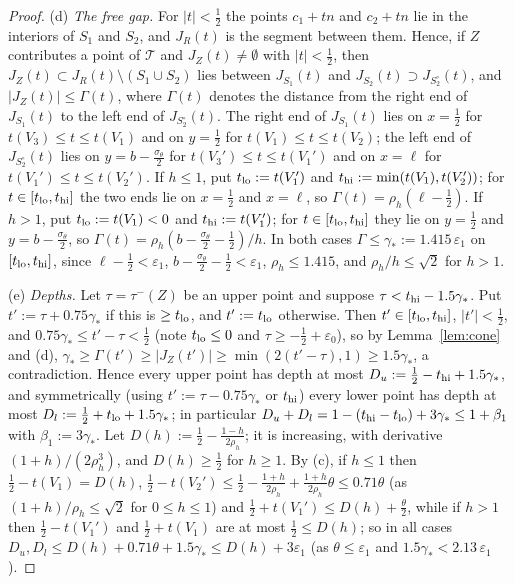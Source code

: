 \documentclass[11pt]{amsart}
\theoremstyle{definition}
\theoremstyle{remark}
\begin{document}
\begin{proof}
(d) \emph{The free gap.} For $|t|<\frac12$ the points $c_1+tn$ and $c_2+tn$ lie in the interiors of $S_1$ and $S_2$, and
$J_R(t)$ is the segment between them. Hence, if $Z$ contributes a point of $\mathcal T$ and $J_Z(t)\neq\emptyset$ with $|t|<\frac12$,
then $J_Z(t)\subset J_R(t)\setminus(S_1\cup S_2)$ lies between $J_{S_1}(t)$ and $J_{S_2}(t)\supset J_{S_2^\circ}(t)$, and
$|J_Z(t)|\le\Gamma(t)$, where $\Gamma(t)$ denotes the distance from the right end of $J_{S_1}(t)$ to the left end of
$J_{S_2^\circ}(t)$. The right end of $J_{S_1}(t)$ lies on $x=\frac12$ for $t(V_3)\le t\le t(V_1)$ and on $y=\frac12$ for
$t(V_1)\le t\le t(V_2)$; the left end of $J_{S_2^\circ}(t)$ lies on $y=b-\frac{\sigma_\theta}2$ for $t(V_3')\le t\le t(V_1')$ and on
$x=\ell$ for $t(V_1')\le t\le t(V_2')$. If $h\le1$, put $t_{\rm lo}:=t(V_1')$ and $t_{\rm hi}:=\min(t(V_1),t(V_2'))$; for
$t\in[t_{\rm lo},t_{\rm hi}]$ the two ends lie on $x=\frac12$ and $x=\ell$, so $\Gamma(t)=\rho_h(\ell-\frac12)$. If $h>1$, put
$t_{\rm lo}:=t(V_1)<0$ and $t_{\rm hi}:=t(V_1')$; for $t\in[t_{\rm lo},t_{\rm hi}]$ they lie on $y=\frac12$ and $y=b-\frac{\sigma_\theta}2$,
so $\Gamma(t)=\rho_h(b-\frac{\sigma_\theta}2-\frac12)/h$. In both cases $\Gamma\le\gamma_*:=1.415\,\varepsilon_1$ on $[t_{\rm lo},t_{\rm hi}]$, since
$\ell-\frac12<\varepsilon_1$, $b-\frac{\sigma_\theta}2-\frac12<\varepsilon_1$, $\rho_h\le1.415$, and $\rho_h/h\le\sqrt2$ for $h>1$.

(e) \emph{Depths.} Let $\tau=\tau^-(Z)$ be an upper point and suppose $\tau<t_{\rm hi}-1.5\gamma_*$. Put $t':=\tau+0.75\gamma_*$ if
this is $\ge t_{\rm lo}$, and $t':=t_{\rm lo}$ otherwise. Then $t'\in[t_{\rm lo},t_{\rm hi}]$, $|t'|<\frac12$, and
$0.75\gamma_*\le t'-\tau<\frac12$ (note $t_{\rm lo}\le0$ and $\tau\ge-\frac12+\varepsilon_0$), so by Lemma~\ref{lem:cone} and (d),
$\gamma_*\ge\Gamma(t')\ge|J_Z(t')|\ge\min(2(t'-\tau),1)\ge1.5\gamma_*$, a contradiction. Hence every upper
point has depth at most $D_u:=\frac12-t_{\rm hi}+1.5\gamma_*$, and symmetrically (using $t':=\tau-0.75\gamma_*$ or $t_{\rm hi}$) every
lower point has depth at most $D_l:=\frac12+t_{\rm lo}+1.5\gamma_*$; in particular $D_u+D_l=1-(t_{\rm hi}-t_{\rm lo})+3\gamma_*\le1+\beta_1$
with $\beta_1:=3\gamma_*$. Let $D(h):=\frac12-\frac{1-h}{2\rho_h}$; it is increasing, with derivative $(1+h)/(2\rho_h^3)$, and
$D(h)\ge\frac12$ for $h\ge1$. By (c), if $h\le1$ then $\frac12-t(V_1)=D(h)$, $\frac12-t(V_2')\le\frac12-\frac{1+h}{2\rho_h}
+\frac{1+h}{2\rho_h}\theta\le0.71\theta$ (as $(1+h)/\rho_h\le\sqrt2$ for $0\le h\le1$) and $\frac12+t(V_1')\le D(h)+\frac\theta2$, while if $h>1$ then $\frac12-t(V_1')$ and
$\frac12+t(V_1)$ are at most $\frac12\le D(h)$; so in all cases $D_u,D_l\le D(h)+0.71\theta+1.5\gamma_*\le D(h)+3\varepsilon_1$
(as $\theta\le\varepsilon_1$ and $1.5\gamma_*<2.13\,\varepsilon_1$).


\end{proof}
\end{document}
